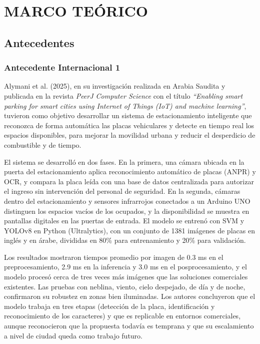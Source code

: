 \documentclass[12pt,a4paper]{article}
\begin{document}
\clearpage
\section{MARCO TEÓRICO}

\subsection{Antecedentes}

\subsubsection{Antecedente Internacional 1}

Alymani et al. (2025), en su investigación realizada en Arabia Saudita y publicada en la revista \textit{PeerJ Computer Science} con el título \textit{``Enabling smart parking for smart cities using Internet of Things (IoT) and machine learning''}, tuvieron como objetivo desarrollar un sistema de estacionamiento inteligente que reconozca de forma automática las placas vehiculares y detecte en tiempo real los espacios disponibles, para mejorar la movilidad urbana y reducir el desperdicio de combustible y de tiempo.

El sistema se desarrolló en dos fases. En la primera, una cámara ubicada en la puerta del estacionamiento aplica reconocimiento automático de placas (ANPR) y OCR, y compara la placa leída con una base de datos centralizada para autorizar el ingreso sin intervención del personal de seguridad. En la segunda, cámaras dentro del estacionamiento y sensores infrarrojos conectados a un Arduino UNO distinguen los espacios vacíos de los ocupados, y la disponibilidad se muestra en pantallas digitales en las puertas de entrada. El modelo se entrenó con SVM y YOLOv8 en Python (Ultralytics), con un conjunto de 1381 imágenes de placas en inglés y en árabe, divididas en 80\% para entrenamiento y 20\% para validación.

Los resultados mostraron tiempos promedio por imagen de 0.3 ms en el preprocesamiento, 2.9 ms en la inferencia y 3.0 ms en el posprocesamiento, y el modelo procesó cerca de tres veces más imágenes que las soluciones comerciales existentes. Las pruebas con neblina, viento, cielo despejado, de día y de noche, confirmaron su robustez en zonas bien iluminadas. Los autores concluyeron que el modelo trabaja en tres etapas (detección de la placa, identificación y reconocimiento de los caracteres) y que es replicable en entornos comerciales, aunque reconocieron que la propuesta todavía es temprana y que su escalamiento a nivel de ciudad queda como trabajo futuro.
\end{document}
